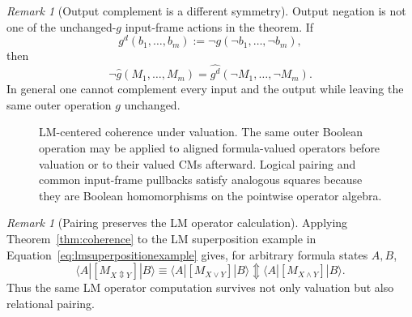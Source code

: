 \documentclass[11pt]{article}
\theoremstyle{definition}
\theoremstyle{remark}
\newtheorem{remark}[theorem]{Remark}
\newcommand{\xor}{\mathbin{\Updownarrow}}
\begin{document}
\begin{remark}[Output complement is a different symmetry]
Output negation is not one of the unchanged-$g$ input-frame actions in the theorem.  If
\[
 g^d(b_1,\ldots,b_m):=\neg g(\neg b_1,\ldots,\neg b_m),
\]
then
\[
 \neg\widehat g(M_1,\ldots,M_m)
 =\widehat{g^d}(\neg M_1,\ldots,\neg M_m).
\]
In general one cannot complement every input and the output while leaving the same outer operation $g$ unchanged.
\end{remark}

\begin{figure}[ht]
\centering
{}
\caption{LM-centered coherence under valuation.  The same outer Boolean operation may be applied to aligned formula-valued operators before valuation or to their valued CMs afterward.  Logical pairing and common input-frame pullbacks satisfy analogous squares because they are Boolean homomorphisms on the pointwise operator algebra.}
\label{fig:coherencesquare}
\end{figure}

\begin{remark}[Pairing preserves the LM operator calculation]
Applying Theorem~\ref{thm:coherence} to the LM superposition example in Equation~\eqref{eq:lmsuperpositionexample} gives, for arbitrary formula states $A,B$,
\[
 \langle A|[M_{X\Updownarrow Y}]|B\rangle
 \equiv
 \langle A|[M_{X\lor Y}]|B\rangle
 \xor
 \langle A|[M_{X\land Y}]|B\rangle.
\]
Thus the same LM operator computation survives not only valuation but also relational pairing.
\end{remark}
\end{document}
